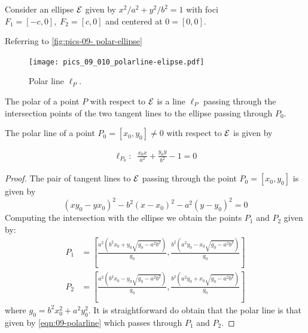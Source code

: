  
 
 
  Consider an ellipse $\mathcal{E}$ given by $x^2/a^2+y^2/b^2=1$ with foci $F_1=[-c,0],\; F_2=[c,0]$ and centered at $0=[0,0].$
  
  Referring to \cref{fig:pics-09- polar-ellipse}
  
  \begin{figure}
      \centering
      \texttt{[image: pics\_09\_010\_polarline-elipse.pdf]}
      \caption{Polar line $\ell_P$.}
      \label{fig:pics-09-polar-ellipse}
  \end{figure}
 \begin{definition}
The polar of a point $P$ with respect to $\mathcal{E}$ is a line $\ell_{P}$ passing through the intersection points  of the two tangent lines to the ellipse passing through $P_0$.
 \label{def:09polarline}
 \end{definition}
 
 \begin{lemma}
 The polar line   of a point $P_0=[x_0,y_0]\ne 0$ with respect to  $\mathcal{E}$  is given by
 
 \begin{align}
\ell_{P_0}: \;\; \frac{x_0x}{a^2}+\frac{y_0y}{b^2}-1=0 \label{eqn:09-polarline}
\end{align}
  \label{lem:09polarline}
  \end{lemma}
  
  \begin{proof}
  The pair of tangent lines to $\mathcal{E}$ passing through the point $P_0=[x_0,y_0]$ is given by
 \[ \left( x{ y_0}-y{x_0} \right) ^{2}-{b}^{2} \left( x-{  x_0}
 \right) ^{2}-{a}^{2} \left( y-{ y_0} \right) ^{2}=0 \]
 Computing the intersection with the ellipse we obtain the points $P_1$ and $P_2$ given by:
 \begin{align*}
     P_1 &= \left[\frac{ a^2\left(b^2 x_0 +   y_0\sqrt{g_0-a^2b^2}\right)}{g_0},   \frac{b^2\left(a^2y_0 -  x_0\sqrt{g_0-a^2b^2}\right)}{g_0} \right] \\
      P_2 &= \left[\frac{ a^2\left(b^2 x_0 -   y_0\sqrt{g_0-a^2b^2}\right)}{g_0},   \frac{b^2\left(a^2y_0+  x_0\sqrt{g_0-a^2b^2}\right)}{g_0} \right] 
 \end{align*}
 where $g_0=b^2x_0^2+a^2y_0^2.$
 It is straightforward do obtain that the polar line is that given by  \cref{eqn:09-polarline} which passes through  $P_1$ and $P_2$.
  \end{proof}
  
